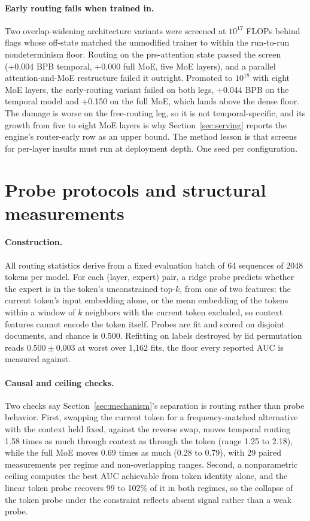 \documentclass{article}
\begin{document}
\paragraph{Early routing fails when trained in.} Two overlap-widening architecture
variants were screened at $10^{17}$ FLOPs behind flags whose off-state matched the
unmodified trainer to within the run-to-run nondeterminism floor. Routing on the
pre-attention state passed the screen (+0.004 BPB temporal, +0.000 full MoE, five MoE
layers), and a parallel attention-and-MoE restructure failed it outright. Promoted to
$10^{18}$ with eight MoE layers, the early-routing variant failed on both legs, +0.044 BPB
on the temporal model and +0.150 on the full MoE, which lands above the dense floor. The
damage is worse on the free-routing leg, so it is not temporal-specific, and its growth
from five to eight MoE layers is why Section~\ref{sec:serving} reports the engine's
router-early row as an upper bound. The method lesson is that screens for per-layer
insults must run at deployment depth. One seed per configuration.

\section{Probe protocols and structural measurements}\label{app:probes}

\paragraph{Construction.} All routing statistics derive from a fixed evaluation batch of
64 sequences of 2048 tokens per model. For each (layer, expert) pair, a ridge probe
predicts whether the expert is in the token's unconstrained top-$k$, from one of two
features: the current token's input embedding alone, or the mean embedding of the tokens
within a window of $k$ neighbors with the current token excluded, so context features
cannot encode the token itself. Probes are fit and scored on disjoint documents, and
chance is 0.500. Refitting on labels destroyed by iid permutation reads $0.500\pm0.003$ at
worst over 1,162 fits, the floor every reported AUC is measured against.

\paragraph{Causal and ceiling checks.} Two checks say Section~\ref{sec:mechanism}'s
separation is routing rather than probe behavior. First, swapping the current token for a
frequency-matched alternative with the context held fixed, against the reverse swap, moves
temporal routing 1.58 times as much through context as through the token (range 1.25 to
2.18), while the full MoE moves 0.69 times as much (0.28 to 0.79), with 29 paired
measurements per regime and non-overlapping ranges. Second, a nonparametric ceiling
computes the best AUC achievable from token identity alone, and the linear token probe
recovers 99 to 102\% of it in both regimes, so the collapse of the token probe under the
constraint reflects absent signal rather than a weak probe.
\end{document}
